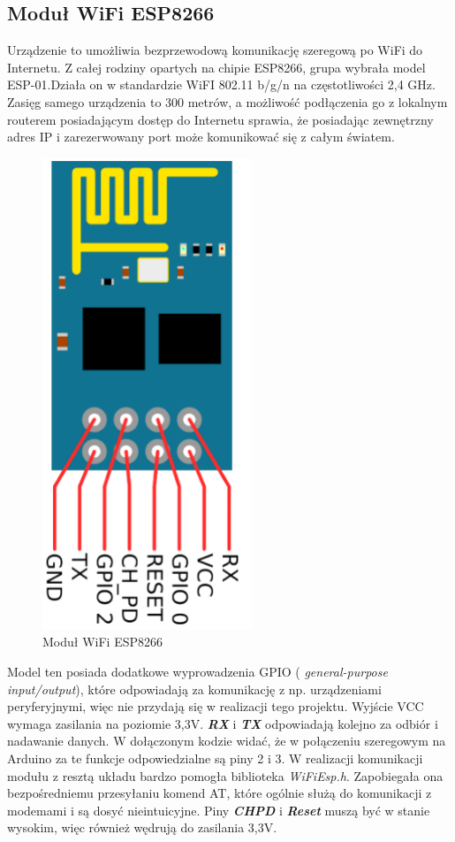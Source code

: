 \documentclass[polish, 11pt]{article}
\begin{document}
\subsection{Moduł WiFi ESP8266}
Urządzenie to umożliwia bezprzewodową komunikację szeregową po WiFi do Internetu. Z całej rodziny opartych na chipie ESP8266, grupa wybrała model ESP-01.Działa on w standardzie WiFI 802.11 b/g/n na częstotliwości 2,4 GHz. Zasięg samego urządzenia to 300 metrów, a możliwość podłączenia go z lokalnym routerem posiadającym dostęp do Internetu sprawia, że posiadając zewnętrzny adres IP i zarezerwowany port może komunikować się z całym światem. 
\begin{figure}[H]
    \centering
    \includegraphics[scale=0.4]{esp8266.png}
\caption{Moduł WiFi ESP8266}
\end{figure}
Model ten posiada dodatkowe wyprowadzenia GPIO (\textit{ general-purpose input/output}), które odpowiadają za komunikację z np. urządzeniami peryferyjnymi, więc nie przydają się w realizacji tego projektu. Wyjście VCC wymaga zasilania na poziomie 3,3V. \textbf{\textit{RX}} i \textbf{\textit{TX}} odpowiadają kolejno za odbiór i nadawanie danych. W dołączonym kodzie widać, że w połączeniu szeregowym na Arduino za te funkcje odpowiedzialne są piny 2 i 3. W realizacji komunikacji modułu z resztą układu bardzo pomogła biblioteka \textit{WiFiEsp.h}. Zapobiegała ona bezpośredniemu przesyłaniu komend AT, które ogólnie służą do komunikacji z modemami i są dosyć nieintuicyjne. Piny \textbf{\textit{CHPD}} i \textbf{\textit{Reset}} muszą być w stanie wysokim, więc również wędrują do zasilania 3,3V. 
\end{document}
